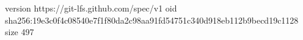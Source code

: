 version https://git-lfs.github.com/spec/v1
oid sha256:19e3c0f4c08540e7f1f80da2c98aa91fd54751c340d918eb112b9becd19c1128
size 497
